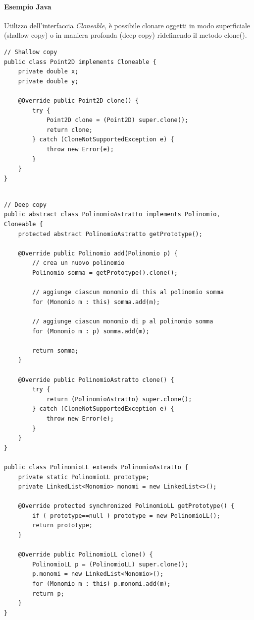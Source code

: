 \newpage

\paragraph{Esempio Java} Utilizzo dell'interfaccia \textit{Cloneable}, è possibile clonare oggetti in modo superficiale (shallow copy) o in maniera profonda (deep copy) ridefinendo il metodo clone().

\begin{verbatim}
// Shallow copy
public class Point2D implements Cloneable {
    private double x; 
    private double y;
    
    @Override public Point2D clone() { 
        try { 
            Point2D clone = (Point2D) super.clone(); 
            return clone;
        } catch (CloneNotSupportedException e) {
            throw new Error(e);
        } 
    } 
}
\end{verbatim}

\newpage

\begin{verbatim}

// Deep copy
public abstract class PolinomioAstratto implements Polinomio, Cloneable { 
    protected abstract PolinomioAstratto getPrototype(); 

    @Override public Polinomio add(Polinomio p) { 
        // crea un nuovo polinomio 
        Polinomio somma = getPrototype().clone(); 

        // aggiunge ciascun monomio di this al polinomio somma 
        for (Monomio m : this) somma.add(m); 
        
        // aggiunge ciascun monomio di p al polinomio somma 
        for (Monomio m : p) somma.add(m); 
        
        return somma; 
    } 
    
    @Override public PolinomioAstratto clone() { 
        try { 
            return (PolinomioAstratto) super.clone(); 
        } catch (CloneNotSupportedException e) { 
            throw new Error(e); 
        }
    }
}

public class PolinomioLL extends PolinomioAstratto { 
    private static PolinomioLL prototype; 
    private LinkedList<Monomio> monomi = new LinkedList<>(); 
    
    @Override protected synchronized PolinomioLL getPrototype() { 
        if ( prototype==null ) prototype = new PolinomioLL(); 
        return prototype;
    } 
    
    @Override public PolinomioLL clone() {
        PolinomioLL p = (PolinomioLL) super.clone();
        p.monomi = new LinkedList<Monomio>(); 
        for (Monomio m : this) p.monomi.add(m); 
        return p;
    }
}

\end{verbatim}

\newpage
